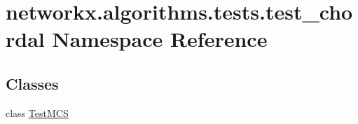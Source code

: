 \hypertarget{namespacenetworkx_1_1algorithms_1_1tests_1_1test__chordal}{}\section{networkx.\+algorithms.\+tests.\+test\+\_\+chordal Namespace Reference}
\label{namespacenetworkx_1_1algorithms_1_1tests_1_1test__chordal}
\subsection*{Classes}
\begin{DoxyCompactItemize}
\item 
class \hyperlink{classnetworkx_1_1algorithms_1_1tests_1_1test__chordal_1_1TestMCS}{Test\+M\+CS}
\end{DoxyCompactItemize}
